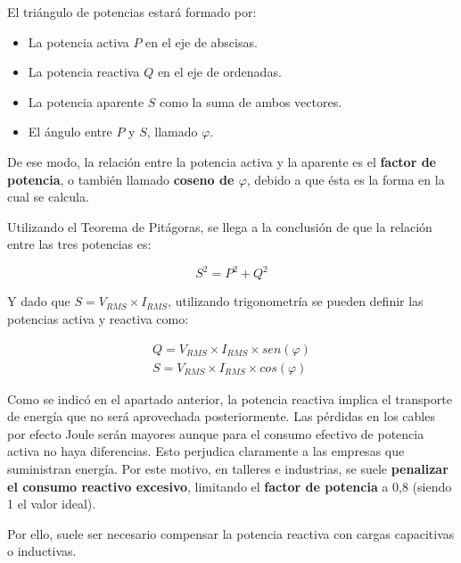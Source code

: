 El triángulo de potencias estará formado por:
\begin{itemize}
	\item La potencia activa $P$ en el eje de abscisas.
	\item La potencia reactiva $Q$ en el eje de ordenadas.
	\item La potencia aparente $S$ como la suma de ambos vectores.
	\item El ángulo entre $P$ y $S$, llamado $\varphi$.
\end{itemize}

De ese modo, la relación entre la potencia activa y la aparente es el \textbf{factor de potencia}, o también llamado \textbf{coseno de $\varphi$}, debido a que ésta es la forma en la cual se calcula.

Utilizando el Teorema de Pitágoras, se llega a la conclusión de que la relación entre las tres potencias es:

\begin{equation}
	\label{eq:potencias_alterna}
	S^{2}=P^{2}+Q^{2}
\end{equation}

Y dado que $S=V_{RMS}\times I_{RMS}$, utilizando trigonometría se pueden definir las potencias activa y reactiva como:

\begin{eqnarray}
	\label{eq:potencias_activa_reactiva}
	Q=V_{RMS}\times I_{RMS} \times sen(\varphi) \\
	S=V_{RMS}\times I_{RMS} \times cos(\varphi)
\end{eqnarray}

Como se indicó en el apartado anterior, la potencia reactiva implica el transporte de energía que no será aprovechada posteriormente. Las pérdidas en los cables por efecto Joule serán mayores aunque para el consumo efectivo de potencia activa no haya diferencias. Esto perjudica claramente a las empresas que suministran energía. Por este motivo, en talleres e industrias, se suele \textbf{penalizar el consumo reactivo excesivo}, limitando el \textbf{factor de potencia} a 0,8 (siendo 1 el valor ideal).

Por ello, suele ser necesario compensar la potencia reactiva con cargas capacitivas o inductivas.  